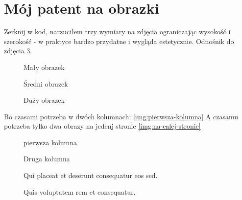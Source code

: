 \section{Mój patent na obrazki}

Zerknij w kod, narzuciłem trzy wymiary na zdjęcia ograniczając wysokość i szerokość - w praktyce bardzo przydatne i wygląda estetycznie. Odnośnik do zdjęcia \ref{img:big}.

\begin{figure}[h]
    \centering
    \caption{Mały obrazek}
    \label{img:small}
\end{figure}

\begin{figure}[h]
    \centering
    \caption{Średni obrazek}
    \label{img:meidum}
\end{figure}

\begin{figure}[h]
    \centering
    \caption{Duży obrazek}
    \label{img:big}
\end{figure}

Bo czasami potrzeba w dwóch kolumnach: \ref{img:pierwsza-kolumna}
A czasamu potrzeba tylko dwa obrazy na jedenj stronie \ref{img:na-calej-stronie}

\begin{figure}[h]
    \begin{mytwocolumn}
        \caption{pierwsza kolumna}
        \label{img:pierwsza-kolumna}
    \end{mytwocolumn}
    \begin{mytwocolumn}
        \caption{Druga kolumna}
        \label{img:druga_kolumna}
    \end{mytwocolumn}
\end{figure}


\begin{figure}[h]
    \begin{minipage}[t][0.5\textheight][t]{\linewidth}
        \centering
        \caption{Qui placeat et deserunt consequatur eos sed.}
        \label{img:na-calej-stronie}
    \end{minipage}

    \begin{minipage}[t][0.48\textheight][t]{\linewidth}
        \centering
        \caption{Quis voluptatem rem et consequatur.}
        \label{img:na-calej-stronie_2}
    \end{minipage}
\end{figure}

